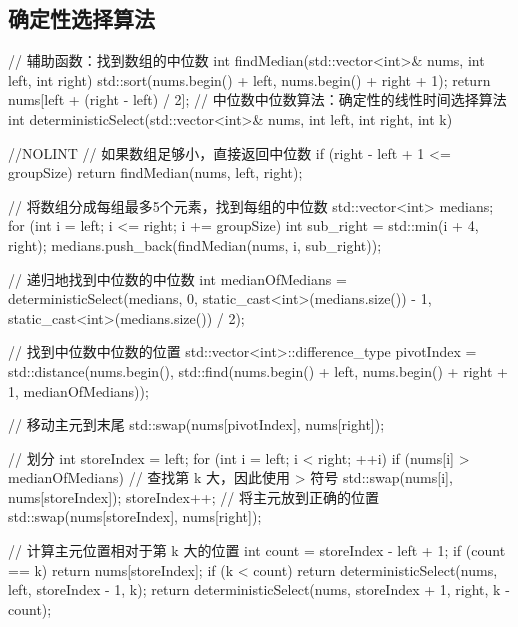 \subsection{确定性选择算法}
\begin{cppcode}
// 辅助函数：找到数组的中位数
int findMedian(std::vector<int>& nums, int left, int right) {
    std::sort(nums.begin() + left, nums.begin() + right + 1);
    return nums[left + (right - left) / 2];
}
// 中位数中位数算法：确定性的线性时间选择算法
int deterministicSelect(std::vector<int>& nums, int left, int right, int k) { //NOLINT
    // 如果数组足够小，直接返回中位数
    if (right - left + 1 <= groupSize) {
        return findMedian(nums, left, right);
    }

    // 将数组分成每组最多5个元素，找到每组的中位数
    std::vector<int> medians;
    for (int i = left; i <= right; i += groupSize) {
        int sub_right = std::min(i + 4, right);
        medians.push_back(findMedian(nums, i, sub_right));
    }

    // 递归地找到中位数的中位数
    int medianOfMedians = deterministicSelect(medians, 0, static_cast<int>(medians.size()) - 1, static_cast<int>(medians.size()) / 2);

    // 找到中位数中位数的位置
    std::vector<int>::difference_type pivotIndex = std::distance(nums.begin(), std::find(nums.begin() + left, nums.begin() + right + 1, medianOfMedians));

    // 移动主元到末尾
    std::swap(nums[pivotIndex], nums[right]);

    // 划分
    int storeIndex = left;
    for (int i = left; i < right; ++i) {
        if (nums[i] > medianOfMedians) { // 查找第 k 大，因此使用 > 符号
            std::swap(nums[i], nums[storeIndex]);
            storeIndex++;
        }
    }
    // 将主元放到正确的位置
    std::swap(nums[storeIndex], nums[right]);

    // 计算主元位置相对于第 k 大的位置
    int count = storeIndex - left + 1;
    if (count == k) {
        return nums[storeIndex];
    }
    if (k < count) {
        return deterministicSelect(nums, left, storeIndex - 1, k);
    }
    return deterministicSelect(nums, storeIndex + 1, right, k - count);
}
\end{cppcode}

